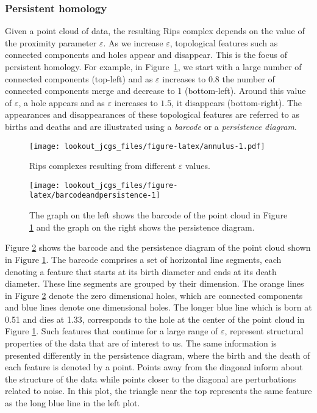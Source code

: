 \documentclass[12pt]{article}
\theoremstyle{definition}
\theoremstyle{definition}
\theoremstyle{definition}
\theoremstyle{definition}
\theoremstyle{remark}
\begin{document}
\hypertarget{persistent-homology}{%
\subsubsection*{Persistent homology}\label{persistent-homology}}

Given a point cloud of data, the resulting Rips complex depends on the value of the proximity parameter \(\varepsilon\). As we increase \(\varepsilon\), topological features such as connected components and holes appear and disappear. This is the focus of persistent homology. For example, in Figure~\ref{fig:annulus}, we start with a large number of connected components (top-left) and as \(\varepsilon\) increases to \(0.8\) the number of connected components merge and decrease to 1 (bottom-left). Around this value of \(\varepsilon\), a hole appears and as \(\varepsilon\) increases to \(1.5\), it disappears (bottom-right). The appearances and disappearances of these topological features are referred to as births and deaths and are illustrated using a \emph{barcode} or a \emph{persistence diagram}.

\begin{figure}
\centering
\texttt{[image: lookout\_jcgs\_files/figure-latex/annulus-1.pdf]}
\caption{\label{fig:annulus}Rips complexes resulting from different \(\varepsilon\) values.}
\end{figure}

\begin{figure}
\texttt{[image: lookout\_jcgs\_files/figure-latex/barcodeandpersistence-1]} \caption{The graph on the left shows the barcode of the point cloud in Figure \ref{fig:annulus} and the graph on the right shows the persistence diagram.}\label{fig:barcodeandpersistence}
\end{figure}

Figure \ref{fig:barcodeandpersistence} shows the barcode and the persistence diagram of the point cloud shown in Figure \ref{fig:annulus}. The barcode comprises a set of horizontal line segments, each denoting a feature that starts at its birth diameter and ends at its death diameter. These line segments are grouped by their dimension. The orange lines in Figure \ref{fig:barcodeandpersistence} denote the zero dimensional holes, which are connected components and blue lines denote one dimensional holes. The longer blue line which is born at 0.51 and dies at 1.33, corresponds to the hole at the center of the point cloud in Figure \ref{fig:annulus}. Such features that continue for a large range of \(\varepsilon\), represent structural properties of the data that are of interest to us. The same information is presented differently in the persistence diagram, where the birth and the death of each feature is denoted by a point. Points away from the diagonal inform about the structure of the data while points closer to the diagonal are perturbations related to noise. In this plot, the triangle near the top represents the same feature as the long blue line in the left plot.
\end{document}
